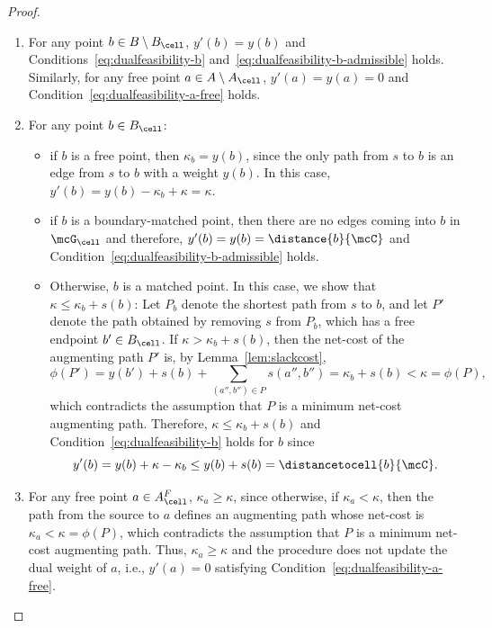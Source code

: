 \begin{proof}
    \begin{enumerate}
        \item For any point $b\in B\setminus B_\cell$, $y'(b)=y(b)$ and Conditions~\eqref{eq:dualfeasibility-b} and~\eqref{eq:dualfeasibility-b-admissible} holds. Similarly, for any free point $a\in A\setminus A_\cell$, $y'(a)=y(a)=0$ and Condition~\eqref{eq:dualfeasibility-a-free} holds.
        \item For any point $b\in B_\cell$:
        \begin{itemize}
            \item if $b$ is a free point, then $\kappa_b= y(b)$, since the only path from $s$ to $b$ is an edge from $s$ to $b$ with a weight $y(b)$. In this case, $y'(b)= y(b) -\kappa_b+\kappa=\kappa$.
            \item if $b$ is a boundary-matched point, then there are no edges coming into $b$ in $\mcG_\cell$ and therefore, $y'(b)=y(b)=\distance{b}{\mcC}$ and Condition~\eqref{eq:dualfeasibility-b-admissible} holds.
            \item Otherwise, $b$ is a matched point. In this case, we show that $\kappa\le \kappa_b+s(b)$: Let $P_b$ denote the shortest path from $s$ to $b$, and let $P'$ denote the path obtained by removing $s$ from $P_b$, which has a free endpoint $b'\in B_\cell$. If $\kappa> \kappa_b+s(b)$, then the net-cost of the augmenting path $P'$ is, by Lemma~\ref{lem:slackcost},
            \[\phi(P')=y(b')+s(b)+ \sum_{(a'',b'') \in P}s(a'',b'') = \kappa_b + s(b)< \kappa=\phi(P),\]
            which contradicts the assumption that $P$ is a minimum net-cost augmenting path. 
            Therefore, $\kappa\le \kappa_b+s(b)$ and Condition~\eqref{eq:dualfeasibility-b} holds for $b$ since 
            \begin{equation}
                y'(b) = y(b) + \kappa - \kappa_b \le y(b) + s(b) =\distancetocell{b}{\mcC}. 
            \end{equation}
        \end{itemize}
        \item For any free point $a\in A_\cell^F$, $\kappa_a\ge \kappa$, since otherwise, if $\kappa_a<\kappa$, then the path from the source to $a$ defines an augmenting path whose net-cost is $\kappa_a<\kappa=\phi(P)$, which contradicts the assumption that $P$ is a minimum net-cost augmenting path. Thus, $\kappa_a\ge \kappa$ and the procedure does not update the dual weight of $a$, i.e., $y'(a)=0$ satisfying Condition~\eqref{eq:dualfeasibility-a-free}. 
        

\end{enumerate}
\end{proof}
